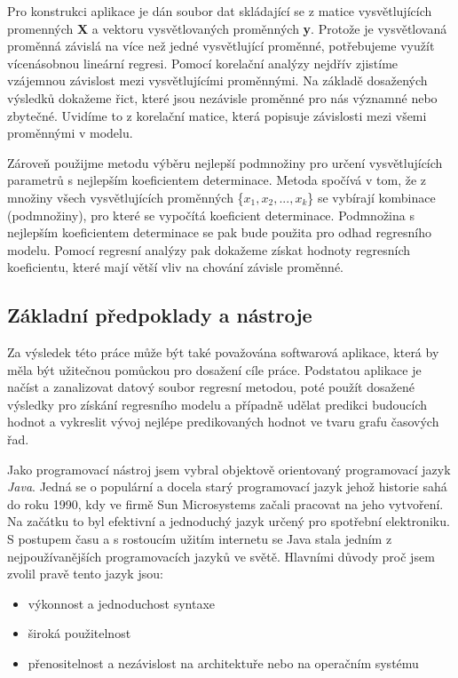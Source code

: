\documentclass[a4paper,12pt,twoside]{scrreprt}
\begin{document}
Pro konstrukci aplikace je dán soubor dat skládající se z matice vysvětlujících promenných \textbf{X} a vektoru vysvětlovaných proměnných \textbf{y}. Protože je vysvětlovaná proměnná závislá na více než jedné vysvětlující proměnné, potřebujeme využít vícenásobnou lineární regresi. Pomocí korelační analýzy nejdřív zjistíme vzájemnou závislost mezi vysvětlujícími proměnnými. Na základě dosažených výsledků dokažeme řict, které jsou nezávisle proměnné pro nás významné nebo zbytečné. Uvidíme to z korelační matice, která popisuje závislosti mezi všemi proměnnými v modelu. 

Zároveň použijme metodu výběru nejlepší podmnožiny pro určení vysvětlujících parametrů s nejlepším koeficientem determinace. Metoda spočívá v tom, že z množiny všech vysvětlujících proměnných \{$x_1, x_2, ..., x_k$\} se vybírají kombinace (podmnožiny), pro které se vypočítá koeficient determinace. Podmnožina s nejlepším koeficientem determinace se pak bude použita pro odhad regresního modelu. Pomocí regresní analýzy pak dokažeme získat hodnoty regresních koeficientu, které mají větší vliv na chování závisle proměnné. 

\subsection{Základní předpoklady a nástroje}
Za výsledek této práce může být také považována softwarová aplikace, která by měla být užitečnou pomůckou pro dosažení cíle práce. Podstatou aplikace je načíst a zanalizovat datový soubor regresní metodou, poté použít dosažené výsledky pro získání regresního modelu a případně udělat predikci budoucích hodnot a vykreslit vývoj nejlépe predikovaných hodnot ve tvaru grafu časových řad. 

Jako programovací nástroj jsem vybral objektově orientovaný programovací jazyk \textit{Java}. Jedná se o populární a docela starý programovací jazyk jehož historie sahá do roku 1990, kdy ve firmě Sun Microsystems začali pracovat na jeho vytvoření. Na začátku to byl efektivní a jednoduchý jazyk určený pro spotřební elektroniku. S postupem času a s rostoucím užitím internetu se Java stala jedním z nejpoužívanějších programovacích jazyků ve světě. Hlavními důvody proč jsem zvolil pravě tento jazyk jsou: 

\begin{itemize}
\item výkonnost a jednoduchost syntaxe
\item široká použitelnost
\item přenositelnost a nezávislost na architektuře nebo na operačním systému
\end{itemize} 
\end{document}
